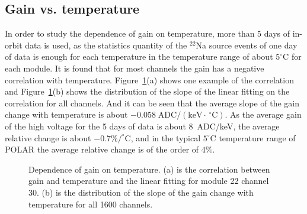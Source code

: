 \documentclass[preprint,sort&compress,12pt]{elsarticle}
\begin{document}
\subsection{Gain vs. temperature}\label{sec:gain_temp}

In order to study the dependence of gain on temperature, more than 5 days of in-orbit data is used, as the statistics quantity of the $^{22}$Na source events of one day of data is enough for each temperature in the temperature range of about $5^\circ\mathrm{C}$ for each module. It is found that for most channels the gain has a negative correlation with temperature. Figure~\ref{fig:gain_vs_temp}(a) shows one example of the correlation and Figure~\ref{fig:gain_vs_temp}(b) shows the distribution of the slope of the linear fitting on the correlation for all channels. And it can be seen that the average slope of the gain change with temperature is about $-0.058\;\mathrm{ADC}/(\mathrm{keV}\cdot\,^\circ\mathrm{C})$. As the average gain of the high voltage for the 5 days of data is about 8~ADC/keV, the average relative change is about $-0.7\%/^\circ\mathrm{C}$, and in the typical $5^\circ\mathrm{C}$ temperature range of POLAR the average relative change is of the order of $4\%$.

\begin{figure}[!ht]
\centering
{}
\hspace{2mm}
\caption{Dependence of gain on temperature. (a) is the correlation between gain and temperature and the linear fitting for module 22 channel 30. (b) is the distribution of the slope of the gain change with temperature for all 1600 channels.}\label{fig:gain_vs_temp}
\end{figure}
\end{document}
